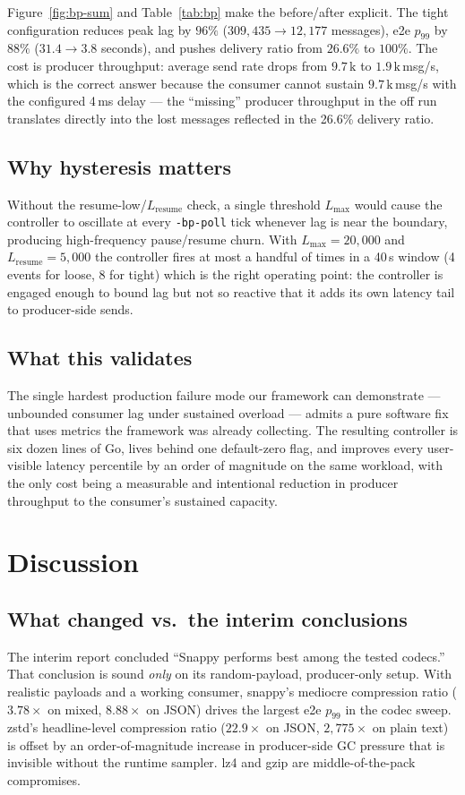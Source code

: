 \documentclass[conference]{IEEEtran}
\begin{document}
Figure~\ref{fig:bp-sum} and Table~\ref{tab:bp} make the
before/after explicit. The tight configuration reduces peak
lag by $96\%$ ($309{,}435 \to 12{,}177$ messages), e2e $p_{99}$
by $88\%$ ($31.4 \to 3.8$ seconds), and pushes delivery ratio
from $26.6\%$ to $100\%$. The cost is producer throughput:
average send rate drops from $9.7\,\text{k}$ to $1.9\,\text{k}$\,msg/s,
which is the correct answer because the consumer cannot sustain
$9.7\,\text{k}$\,msg/s with the configured 4\,ms delay --- the
``missing'' producer throughput in the off run translates directly
into the lost messages reflected in the 26.6\% delivery ratio.

\subsection{Why hysteresis matters}
Without the resume-low/$L_{\mathrm{resume}}$ check, a single threshold
$L_{\max}$ would cause the controller to oscillate at every
\texttt{-bp-poll} tick whenever lag is near the boundary, producing
high-frequency pause/resume churn. With $L_{\max}=20{,}000$ and
$L_{\mathrm{resume}}=5{,}000$ the controller fires at most a handful
of times in a 40\,s window (4 events for loose, 8 for tight) which is
the right operating point: the controller is engaged enough to bound
lag but not so reactive that it adds its own latency tail to
producer-side sends.

\subsection{What this validates}
The single hardest production failure mode our framework can
demonstrate --- unbounded consumer lag under sustained overload ---
admits a pure software fix that uses metrics the framework was
already collecting. The resulting controller is six dozen lines of
Go, lives behind one default-zero flag, and improves every
user-visible latency percentile by an order of magnitude on the
same workload, with the only cost being a measurable and intentional
reduction in producer throughput to the consumer's sustained capacity.

\section{Discussion}

\subsection{What changed vs.\ the interim conclusions}
The interim report concluded ``Snappy performs best among the tested
codecs.'' That conclusion is sound \emph{only} on its
random-payload, producer-only setup. With realistic payloads and a
working consumer, snappy's mediocre compression ratio
($3.78\times$ on mixed, $8.88\times$ on JSON) drives the largest
e2e $p_{99}$ in the codec sweep. zstd's headline-level compression
ratio ($22.9\times$ on JSON, $2{,}775\times$ on plain text) is offset
by an order-of-magnitude increase in producer-side GC pressure that
is invisible without the runtime sampler. lz4 and gzip are middle-of-the-pack compromises.
\end{document}
